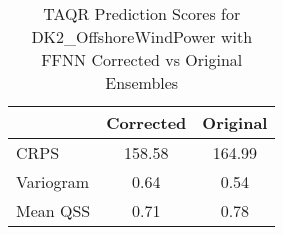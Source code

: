 
    \begin{table}[h!]
    \centering
    \begin{tabular}{|l|c|c|}
    \hline
    \textbf{} & \textbf{Corrected} & \textbf{Original} \\ \hline
    CRPS       & 158.58       & 164.99      \\ \hline
    Variogram  & 0.64  & 0.54 \\ \hline
    Mean QSS   & 0.71        & 0.78       \\ \hline
    \end{tabular}
    \caption{TAQR Prediction Scores for DK2_OffshoreWindPower with FFNN Corrected vs Original Ensembles}
    \label{tab:comparison}
    \end{table}
    